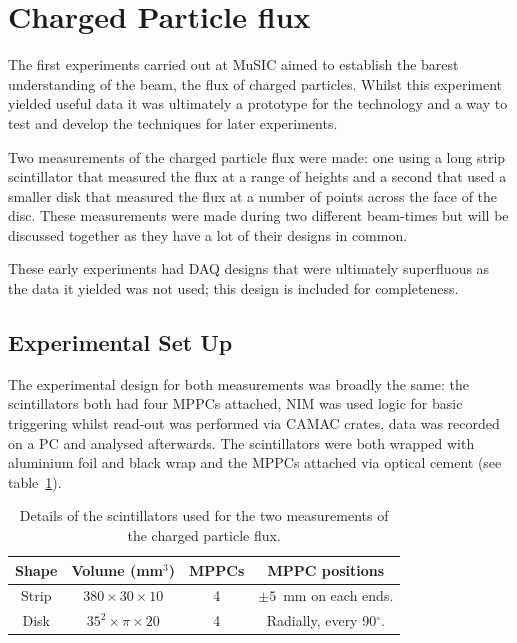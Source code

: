 \section{Charged Particle flux} %
\label{cha:charged_particle_flux}
The first experiments carried out at MuSIC aimed to establish the barest understanding of the beam, the flux of charged particles. Whilst this experiment yielded useful data it was ultimately a prototype for the technology and a way to test and develop the techniques for later experiments.

Two measurements of the charged particle flux were made: one using a long strip scintillator that measured the flux at a range of heights and a second that used a smaller disk that measured the flux at a number of points across the face of the disc. These measurements were made during two different beam-times but will be discussed together as they have a lot of their designs in common.

These early experiments had DAQ designs that were ultimately superfluous as the data it yielded was not used; this design is included for completeness.
\subsection{Experimental Set Up} %
\label{sec:experimental_set_up}
The experimental design for both measurements was broadly the same: the scintillators both had four MPPCs attached, NIM was used logic for basic triggering whilst read-out was performed via CAMAC crates, data was recorded on a PC and analysed afterwards. The scintillators were both wrapped with aluminium foil and black wrap and the MPPCs attached via optical cement (see table~\ref{tab:charged_particle_flux_scint_details}).
\begin{table}
  \begin{center}
    \begin{tabular}{c|c|c|c}
      Shape  &  Volume (mm\(^3\))            &  MPPCs  &  MPPC positions                    \\
      \hline
      Strip  &  \(380 \times30\times10\)     &  4      &  \( \pm 5 \)~mm on each ends.      \\
      Disk   &  \( 35^2\times\pi\times20\)  &  4      &  Radially, every 90\( ^{\circ} \). \\
        
    \end{tabular}
  \end{center}
  \caption{Details of the scintillators used for the two measurements of the charged particle flux.}
  \label{tab:charged_particle_flux_scint_details}
\end{table}

